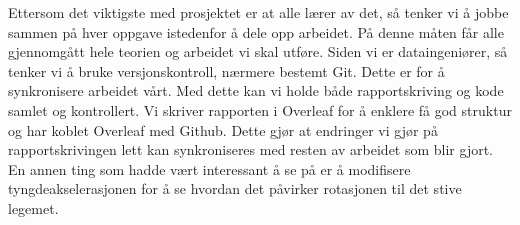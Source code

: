 Ettersom det viktigste med prosjektet er at alle lærer av det, så tenker vi å jobbe sammen på hver oppgave istedenfor å dele opp arbeidet. På denne måten får alle gjennomgått hele teorien og arbeidet vi skal utføre.\newline\newline
Siden vi er dataingeniører, så tenker vi å bruke versjonskontroll, nærmere bestemt Git. Dette er for å synkronisere arbeidet vårt. Med dette kan vi holde både rapportskriving og kode samlet og kontrollert. Vi skriver rapporten i Overleaf for å enklere få god struktur og har koblet Overleaf med Github. Dette gjør at endringer vi gjør på rapportskrivingen lett kan synkroniseres med resten av arbeidet som blir gjort. \newline\newline
En annen ting som hadde vært interessant å se på er å modifisere tyngdeakselerasjonen for å se hvordan det påvirker rotasjonen til det stive legemet.